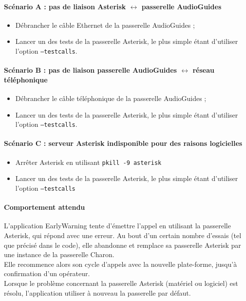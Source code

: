 \documentclass{article}
\begin{document}
\paragraph{Scénario A : pas de liaison Asterisk $\longleftrightarrow$ passerelle AudioGuides\\}

\begin{itemize}
    \item Débrancher le câble Ethernet de la passerelle AudioGuides ;
    \item Lancer un des tests de la passerelle Asterisk, le plus simple étant d'utiliser l'option \texttt{--testcalls}.
\end{itemize}

\paragraph{Scénario B : pas de liaison passerelle AudioGuides $\longleftrightarrow$ réseau téléphonique\\}

\begin{itemize}
    \item Débrancher le câble téléphonique de la passerelle AudioGuides ;
    \item Lancer un des tests de la passerelle Asterisk, le plus simple étant d'utiliser l'option \texttt{--testcalls}.
\end{itemize}

\paragraph{Scénario C : serveur Asterisk indisponible pour des raisons logicielles\\}

\begin{itemize}
    \item Arrêter Asterisk en utilisant \texttt{pkill -9 asterisk}
    \item Lancer un des tests de la passerelle Asterisk, le plus simple étant d'utiliser l'option \texttt{--testcalls}
\end{itemize}

\paragraph{Comportement attendu\\}

L'application EarlyWarning tente d'émettre l'appel en utilisant la passerelle Asterisk, qui répond avec une erreur. Au bout d'un certain nombre d'essais (tel que précisé dans le code), elle abandonne et remplace sa passerelle Asterisk par une instance de la passerelle Charon. \\
Elle recommence alors son cycle d'appels avec la nouvelle plate-forme, jusqu'à confirmation d'un opérateur.\\
Lorsque le problème concernant la passerelle Asterisk (matériel ou logiciel) est résolu, l'application utiliser à nouveau la passerelle par défaut.
\end{document}
